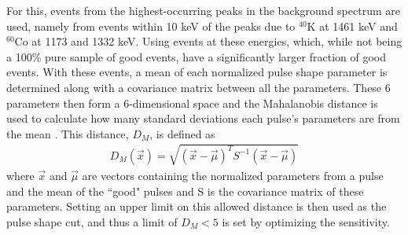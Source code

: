 For this, events from the highest-occurring peaks in the background spectrum are used, namely from events within 10 keV of the peaks due to $^{40}$K at 1461 keV and $^{60}$Co at 1173 and 1332 keV.
Using events at these energies, which, while not being a 100\% pure sample of good events, have a significantly larger fraction of good events.
With these events, a mean of each normalized pulse shape parameter is determined along with a covariance matrix between all the parameters.
These 6 parameters then form a 6-dimensional space and the Mahalanobis distance is used to calculate how many standard deviations each pulse's parameters are from the mean \cite{mahalanobis1936generalized}.
This distance, $D_M$, is defined as
\begin{align}
    D_M(\Vec{x}) = \sqrt{(\Vec{x}-\Vec{\mu})^TS^{-1}(\Vec{x}-\Vec{\mu})}
\end{align}
where $\Vec{x}$ and $\Vec{\mu}$ are vectors containing the normalized parameters from a pulse and the mean of the ``good" pulses and S is the covariance matrix of these parameters.
Setting an upper limit on this allowed distance is then used as the pulse shape cut, and thus a limit of $D_M<5$ is set by optimizing the sensitivity.

